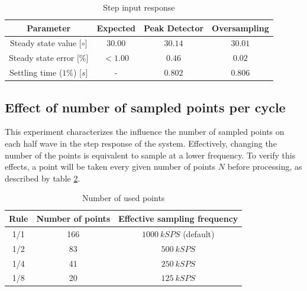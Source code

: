 \documentclass[conference]{IEEEtran}
\begin{document}
\begin{table}[h!]
\centering
\caption{Step input response}
\label{tab:steady_table}
\begin{tabular}{|c|c|c|c|}
\hline
Parameter 				& Expected 	& Peak Detector 	& Oversampling \\ \hline
Steady state value [${\circ}$] 		& $30.00$	& $30.14$ 	& $30.01$ \\ \hline
Steady state error [$\%$]		& $<1.00$		& $0.46$ 		& $0.02$ \\ \hline
Settling time ($1\%$) [$s$]	& -				& $0.802$ 			& $0.806$ \\ \hline
\end{tabular}
\end{table}	

\subsection{Effect of number of sampled points per cycle}

This experiment characterizes the influence the number of sampled points on each half wave in the step response of the system. Effectively, changing the number of the points is equivalent to sample at a lower frequency. To verify this effects, a point will be taken every given number of points $N$ before processing, as described by table \ref{tab:number_of_points}.

\begin{table}[h!]
\centering
\caption{Number of used points}
\label{tab:number_of_points}
\begin{tabular}{|c|c|c|}
\hline
Rule & Number of points & Effective sampling frequency \\ \hline
1/1 & 166 & $1000~kSPS$ (default) \\ \hline
1/2 & 83 & $500~kSPS$ \\ \hline
1/4 & 41 & $250~kSPS$ \\ \hline
1/8 & 20 & $125~kSPS$ \\ \hline
\end{tabular}
\end{table}	
\end{document}
